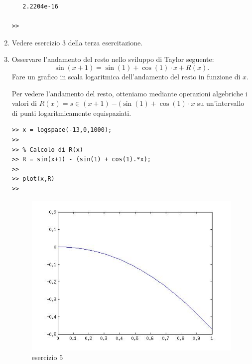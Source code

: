 \begin{enumerate}
\begin{svol}
\begin{codice}
\begin{verbatim}
   2.2204e-16

>> 
\end{verbatim}
\end{codice}
\end{svol}

\item
Vedere esercizio $3$ della terza esercitazione.

\item
Osservare l'andamento del resto nello sviluppo di Taylor seguente:
\[
\sin(x+1) = \sin(1) + \cos(1)\cdot x + R(x).
\]
Fare un grafico in scala logaritmica dell'andamento del resto in funzione
di $x$.

\begin{svol}
Per vedere l'andamento del resto, otteniamo mediante operazioni algebriche
i valori di $R(x) = s\in(x+1) - (\sin(1) +\cos(1)\cdot x$ su un'intervallo di 
punti logaritmicamente equispaziati.
\begin{codice}
\begin{verbatim}
>> x = logspace(-13,0,1000);
>> 
>> % Calcolo di R(x)
>> R = sin(x+1) - (sin(1) + cos(1).*x);
>> 
>> plot(x,R)
>> 
\end{verbatim}
\end{codice}


\begin{figure}[!ht]\begin{center}
\includegraphics[scale=.50]{fig/es4-5.jpg}\end{center}
\caption{esercizio $5$}
\end{figure}
\end{svol}


\end{enumerate}
